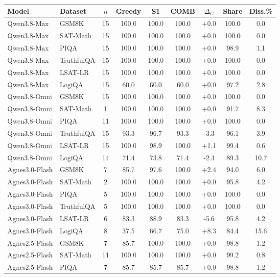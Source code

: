 \scriptsize
\begin{tabular*}{\columnwidth}{@{\extracolsep{\fill}} l l c c c c c c c}
\toprule
Model & Dataset & $n$ & Greedy & S1 & COMB & $\Delta_C$ & Share & Diss.\% \\
\midrule
Qwen3.8-Max & GSM8K & 15 & 100.0 & 100.0 & 100.0 & +0.0 & 100.0 & 0.0 \\
Qwen3.8-Max & SAT-Math & 15 & 100.0 & 100.0 & 100.0 & +0.0 & 100.0 & 0.0 \\
Qwen3.8-Max & PIQA & 15 & 100.0 & 100.0 & 100.0 & +0.0 & 98.9 & 1.1 \\
Qwen3.8-Max & TruthfulQA & 15 & 100.0 & 100.0 & 100.0 & +0.0 & 100.0 & 0.0 \\
Qwen3.8-Max & LSAT-LR & 15 & 100.0 & 100.0 & 100.0 & +0.0 & 100.0 & 0.0 \\
Qwen3.8-Max & LogiQA & 15 & 60.0 & 60.0 & 60.0 & +0.0 & 97.2 & 2.8 \\
\midrule
Qwen3.8-Omni & GSM8K & 15 & 100.0 & 100.0 & 100.0 & +0.0 & 100.0 & 0.0 \\
Qwen3.8-Omni & SAT-Math & 1 & 100.0 & 100.0 & 100.0 & +0.0 & 91.7 & 8.3 \\
Qwen3.8-Omni & PIQA & 11 & 100.0 & 100.0 & 100.0 & +0.0 & 100.0 & 0.0 \\
Qwen3.8-Omni & TruthfulQA & 15 & 93.3 & 96.7 & 93.3 & -3.3 & 96.1 & 3.9 \\
Qwen3.8-Omni & LSAT-LR & 15 & 100.0 & 98.9 & 100.0 & +1.1 & 99.4 & 0.6 \\
Qwen3.8-Omni & LogiQA & 14 & 71.4 & 73.8 & 71.4 & -2.4 & 89.3 & 10.7 \\
\midrule
Agnes3.0-Flash & GSM8K & 7 & 85.7 & 97.6 & 100.0 & +2.4 & 94.0 & 6.0 \\
Agnes3.0-Flash & SAT-Math & 2 & 100.0 & 100.0 & 100.0 & +0.0 & 95.8 & 4.2 \\
Agnes3.0-Flash & PIQA & 5 & 100.0 & 100.0 & 100.0 & +0.0 & 100.0 & 0.0 \\
Agnes3.0-Flash & TruthfulQA & 5 & 100.0 & 100.0 & 100.0 & +0.0 & 100.0 & 0.0 \\
Agnes3.0-Flash & LSAT-LR & 6 & 83.3 & 88.9 & 83.3 & -5.6 & 95.8 & 4.2 \\
Agnes3.0-Flash & LogiQA & 8 & 37.5 & 66.7 & 75.0 & +8.3 & 84.4 & 15.6 \\
\midrule
Agnes2.5-Flash & GSM8K & 7 & 85.7 & 100.0 & 100.0 & +0.0 & 98.8 & 1.2 \\
Agnes2.5-Flash & SAT-Math & 11 & 100.0 & 100.0 & 100.0 & +0.0 & 99.2 & 0.8 \\
Agnes2.5-Flash & PIQA & 7 & 85.7 & 85.7 & 85.7 & +0.0 & 98.8 & 1.2 \\

\end{tabular*}

